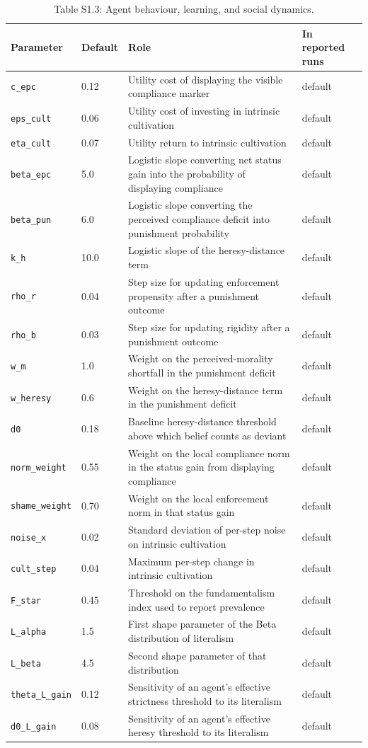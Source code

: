 \documentclass[12pt]{article}
\begin{document}
\begin{table}[htbp]
\centering
\footnotesize
\caption{Table S1.3: Agent behaviour, learning, and social dynamics.}
\begin{tabular}{p{4.9cm}p{1.3cm}p{4.5cm}p{2.4cm}}
\toprule
Parameter & Default & Role & In reported runs \\
\midrule
\texttt{c\_epc} & 0.12 & Utility cost of displaying the visible compliance marker & default \\
\texttt{eps\_cult} & 0.06 & Utility cost of investing in intrinsic cultivation & default \\
\texttt{eta\_cult} & 0.07 & Utility return to intrinsic cultivation & default \\
\texttt{beta\_epc} & 5.0 & Logistic slope converting net status gain into the probability of displaying compliance & default \\
\texttt{beta\_pun} & 6.0 & Logistic slope converting the perceived compliance deficit into punishment probability & default \\
\texttt{k\_h} & 10.0 & Logistic slope of the heresy-distance term & default \\
\texttt{rho\_r} & 0.04 & Step size for updating enforcement propensity after a punishment outcome & default \\
\texttt{rho\_b} & 0.03 & Step size for updating rigidity after a punishment outcome & default \\
\texttt{w\_m} & 1.0 & Weight on the perceived-morality shortfall in the punishment deficit & default \\
\texttt{w\_heresy} & 0.6 & Weight on the heresy-distance term in the punishment deficit & default \\
\texttt{d0} & 0.18 & Baseline heresy-distance threshold above which belief counts as deviant & default \\
\texttt{norm\_weight} & 0.55 & Weight on the local compliance norm in the status gain from displaying compliance & default \\
\texttt{shame\_weight} & 0.70 & Weight on the local enforcement norm in that status gain & default \\
\texttt{noise\_x} & 0.02 & Standard deviation of per-step noise on intrinsic cultivation & default \\
\texttt{cult\_step} & 0.04 & Maximum per-step change in intrinsic cultivation & default \\
\texttt{F\_star} & 0.45 & Threshold on the fundamentalism index used to report prevalence & default \\
\texttt{L\_alpha} & 1.5 & First shape parameter of the Beta distribution of literalism & default \\
\texttt{L\_beta} & 4.5 & Second shape parameter of that distribution & default \\
\texttt{theta\_L\_gain} & 0.12 & Sensitivity of an agent's effective strictness threshold to its literalism & default \\
\texttt{d0\_L\_gain} & 0.08 & Sensitivity of an agent's effective heresy threshold to its literalism & default \\
\bottomrule
\end{tabular}
\end{table}
\end{document}
